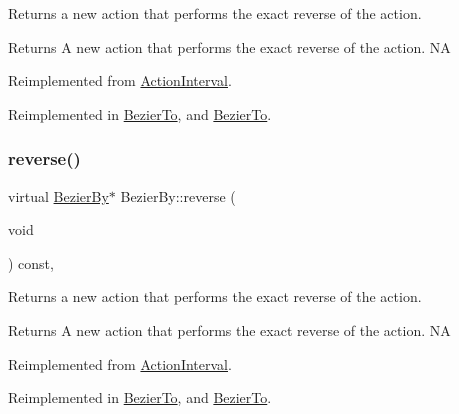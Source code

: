 Returns a new action that performs the exact reverse of the action.

\begin{DoxyReturn}{Returns}
A new action that performs the exact reverse of the action.  NA 
\end{DoxyReturn}


Reimplemented from \hyperlink{classActionInterval_a9f9ac7164036a0bc261a72f62a2b2da7}{Action\+Interval}.



Reimplemented in \hyperlink{classBezierTo_a96685cb733eb9f61b6e6550bcd210f93}{Bezier\+To}, and \hyperlink{classBezierTo_a18d090decbea9839a379121a012063f6}{Bezier\+To}.

\mbox{\label{classBezierBy_ac773db6f4fd27c351c6d4c2c7929b4e7}} 
\subsubsection{\texorpdfstring{reverse()}{reverse()}\hspace{0.1cm}{\footnotesize\ttfamily [2/2]}}
{\footnotesize\ttfamily virtual \hyperlink{classBezierBy}{Bezier\+By}$\ast$ Bezier\+By\+::reverse (\begin{DoxyParamCaption}\item[{void}]{ }\end{DoxyParamCaption}) const\hspace{0.3cm}{\ttfamily [override]}, {\ttfamily [virtual]}}

Returns a new action that performs the exact reverse of the action.

\begin{DoxyReturn}{Returns}
A new action that performs the exact reverse of the action.  NA 
\end{DoxyReturn}


Reimplemented from \hyperlink{classActionInterval_a9f9ac7164036a0bc261a72f62a2b2da7}{Action\+Interval}.



Reimplemented in \hyperlink{classBezierTo_a96685cb733eb9f61b6e6550bcd210f93}{Bezier\+To}, and \hyperlink{classBezierTo_a18d090decbea9839a379121a012063f6}{Bezier\+To}.

\mbox{\label{classBezierBy_a3a68011f000b7f0ad58668b3ec0f7494}} 
